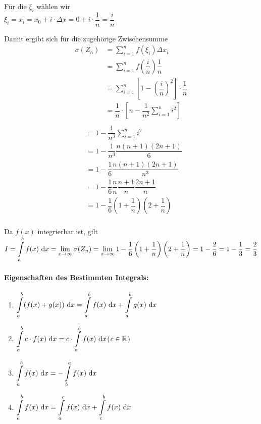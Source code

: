 Für die $\xi_i$ wählen wir\\
$\xi_i=x_i=x_0+i\cdot\Delta x=0+i\cdot\dfrac{1}{n}=\dfrac{i}{n}$

Damit ergibt sich für die zugehörige Zwischensumme\\
\begin{align*}
\sigma(Z_n)&=\sum\limits_{i=1}^{n}f(\xi_i)\Delta x_i\\
&=\sum\limits_{i=1}^{n}f\left(\dfrac{i}{n}\right)\dfrac{1}{n}\\
&=\sum\limits_{i=1}^{n}\left[1-\left(\dfrac{i}{n}\right)^2\right]\cdot\dfrac{1}{n}\\
&=\dfrac{1}{n}\cdot\left[n-\dfrac{1}{n^2}\sum\limits_{i=1}^{n}i^2\right]\\
\end{align*}
\begin{align*}
&=1-\dfrac{1}{n^3}\sum\limits_{i=1}^{n}i^2\\
&=1-\dfrac{1}{n^3}\dfrac{n(n+1)(2n+1)}{6}\\
&=1-\dfrac{1}{6}\dfrac{n(n+1)(2n+1)}{n^3}\\
&=1-\dfrac{1}{6}\dfrac{n}{n}\dfrac{n+1}{n}\dfrac{2n+1}{n}\\
&=1-\dfrac{1}{6}\left(1+\dfrac{1}{n}\right)\left(2+\dfrac{1}{n}\right)\\
\end{align*}

Da $f(x)$ integrierbar ist, gilt\\
$I=\displaystyle\int\limits_{a}^{b}f(x)\ \mathrm{d}x=\lim\limits_{x\to\infty}\sigma(Z_n)=\lim\limits_{x\to\infty}1-\dfrac{1}{6}\left(1+\dfrac{1}{n}\right)\left(2+\dfrac{1}{n}\right)=1-\dfrac{2}{6}=1-\dfrac{1}{3}=\dfrac{2}{3}$

\paragraph{Eigenschaften des Bestimmten Integrals:}
\begin{enumerate}
	\item $\displaystyle\int\limits_{a}^{b}(f(x)+g(x))\ \mathrm{d}x=\displaystyle\int\limits_{a}^{b}f(x)\ \mathrm{d}x+\displaystyle\int\limits_{a}^{b}g(x)\ \mathrm{d}x$
	\item $\displaystyle\int\limits_{a}^{b}c\cdot f(x)\ \mathrm{d}x=c\cdot\displaystyle\int\limits_{a}^{b}f(x)\ \mathrm{d}x$\qquad($c\in\mathbb{R}$)
	\item $\displaystyle\int\limits_{a}^{b}f(x)\ \mathrm{d}x=-\displaystyle\int\limits_{b}^{a}f(x)\ \mathrm{d}x$
	\item $\displaystyle\int\limits_{a}^{b}f(x)\ \mathrm{d}x=\displaystyle\int\limits_{a}^{c}f(x)\ \mathrm{d}x+\displaystyle\int\limits_{c}^{b}f(x)\ \mathrm{d}x$
\end{enumerate}

